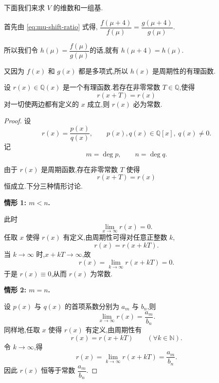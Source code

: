 \begin{problem}
\begin{solution}
        下面我们来求 $V$ 的维数和一组基.

        首先由 \eqref{eq:mu-shift-ratio} 式得,
        $\dfrac{f(\mu + 4)}{f(\mu)} = \dfrac{g(\mu + 4)}{g(\mu)}$.
        
        所以我们令 $h(\mu) = \dfrac{f(\mu)}{g(\mu)}$的话,就有 $h(\mu + 4) = h(\mu)$.
        
        又因为 $f(x)$ 和 $g(x)$ 都是多项式,所以 $h(x)$ 是周期性的有理函数.

        \begin{sollemma*}
            设 \(r(x)\in \mathbb{Q}(x)\) 是一个有理函数.若存在非零常数 \(T\in \mathbb{Q}\),使得
            \[
                r(x+T)=r(x)
            \]
            对一切使两边都有定义的 \(x\) 成立,则 \(r(x)\) 必为常数.
        \end{sollemma*}

        \begin{proof}
            设
            \[
                r(x)=\frac{p(x)}{q(x)},
                \qquad p(x),q(x)\in\mathbb{Q}[x],\ q(x)\neq 0.
            \]
            记
            \[
                m=\deg p,\qquad n=\deg q.
            \]

            由于 \(r(x)\) 是周期函数,存在非零常数 \(T\) 使得
            \[
                r(x+T)=r(x)
            \]
            恒成立.下分三种情形讨论.

            \medskip

            \noindent\textbf{情形 1: \(m<n\).}

            此时
            \[
                \lim_{x\to\infty} r(x)=0.
            \]
            任取 \(x\) 使得 \(r(x)\) 有定义,由周期性可得对任意正整数 \(k\),
            \[
                r(x)=r(x+kT).
            \]
            当 \(k\to\infty\) 时,\(x+kT\to\infty\),故
            \[
                r(x)=\lim_{k\to\infty}r(x+kT)=0.
            \]
            于是 \(r(x)\equiv 0\),从而 \(r(x)\) 为常数.

            \medskip

            \noindent\textbf{情形 2: \(m=n\).}

            设 \(p(x)\) 与 \(q(x)\) 的首项系数分别为 \(a_m\) 与 \(b_n\),则
            \[
                \lim_{x\to\infty} r(x)=\frac{a_m}{b_n}.
            \]
            同样地,任取 \(x\) 使得 \(r(x)\) 有定义,由周期性有
            \[
                r(x)=r(x+kT)\qquad (\forall k\in\mathbb{N}).
            \]
            令 \(k\to\infty\),得
            \[
                r(x)=\lim_{k\to\infty}r(x+kT)=\frac{a_m}{b_n}.
            \]
            因此 \(r(x)\) 恒等于常数 \(\dfrac{a_m}{b_n}\).


\end{proof}
\end{solution}
\end{problem}
